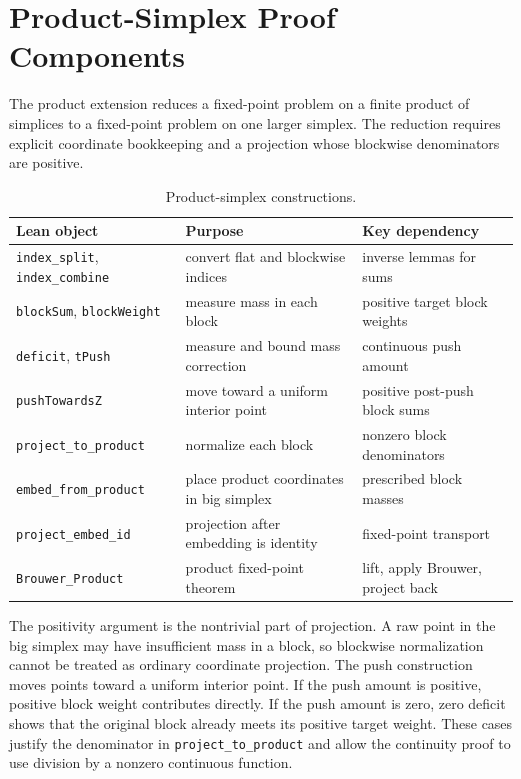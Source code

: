 \documentclass{article}
\theoremstyle{definition}
\begin{document}
\section{Product-Simplex Proof Components}
\label{app:product-details}

The product extension reduces a fixed-point problem on a finite product of simplices to a fixed-point problem on one larger simplex. The reduction requires explicit coordinate bookkeeping and a projection whose blockwise denominators are positive.

\begin{table}[H]
\caption{Product-simplex constructions.}
\label{tab:appendix-product-components}
\begin{center}
    \begin{small}
      \begin{tabular}{lll}
\toprule
Lean object & Purpose & Key dependency \\
\midrule
\texttt{index\_split}, \texttt{index\_combine} &
convert flat and blockwise indices &
inverse lemmas for sums \\
\texttt{blockSum}, \texttt{blockWeight} &
measure mass in each block &
positive target block weights \\
\texttt{deficit}, \texttt{tPush} &
measure and bound mass correction &
continuous push amount \\
\texttt{pushTowardsZ} &
move toward a uniform interior point &
positive post-push block sums \\
\texttt{project\_to\_product} &
normalize each block &
nonzero block denominators \\
\texttt{embed\_from\_product} &
place product coordinates in big simplex &
prescribed block masses \\
\texttt{project\_embed\_id} &
projection after embedding is identity &
fixed-point transport \\
\texttt{Brouwer\_Product} &
product fixed-point theorem &
lift, apply Brouwer, project back \\
\bottomrule
\end{tabular}
    \end{small}
  \end{center}
  \vskip -0.1in
\end{table}

The positivity argument is the nontrivial part of projection. A raw point in the big simplex may have insufficient mass in a block, so blockwise normalization cannot be treated as ordinary coordinate projection. The push construction moves points toward a uniform interior point. If the push amount is positive, positive block weight contributes directly. If the push amount is zero, zero deficit shows that the original block already meets its positive target weight. These cases justify the denominator in \texttt{project\_to\_product} and allow the continuity proof to use division by a nonzero continuous function.
\end{document}

